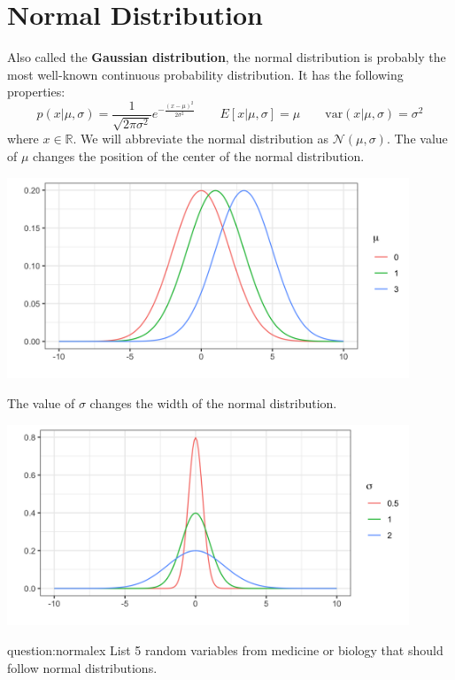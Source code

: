 \section{Normal Distribution \label{sect:normal}} 

Also called the \textbf{Gaussian distribution}, the normal distribution is probably the most well-known continuous probability distribution. It has the following properties:
\begin{equation*} p(x | \mu, \sigma) = \frac{1}{\sqrt{2 \pi \sigma^2}} e^{-\frac{(x-\mu)^2}{2 \sigma^2}} \qquad  E[x| \mu, \sigma] = \mu \qquad \text{var}(x | \mu, \sigma) = \sigma^2 \end{equation*}
where $x \in \mathbb{R}$. We will abbreviate the normal distribution as $\mathcal{N}(\mu, \sigma)$.  The value of $\mu$ changes the position of the center of the normal distribution.
\begin{center}
\includegraphics[width=0.9\textwidth]{img/l01-figure1-normal-mean-change.png}
\end{center}
The value of $\sigma$ changes the width of the normal distribution.
\begin{center}
\includegraphics[width=0.9\textwidth]{img/l01-figure2-normal-sd-change.png}
\end{center}

\begin{question}{question:normalex}
List 5 random variables from medicine or biology that should follow normal distributions.
\end{question}
 

